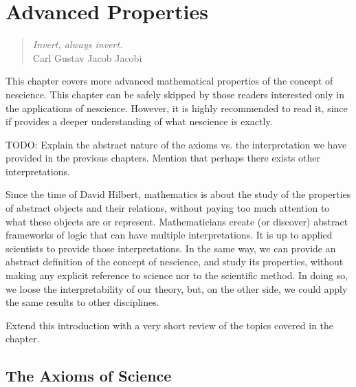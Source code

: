 %
%


\chapter{Advanced Properties}
\label{chap:Properties-Nescience}

\begin{quote}
\begin{flushright}
\emph{Invert, always invert.}\\
Carl Gustav Jacob Jacobi\\
\end{flushright}
\end{quote}
\bigskip

This chapter covers more advanced mathematical properties of the concept of nescience. This chapter can be safely skipped by those readers interested only in the applications of nescience. However, it is highly recommended to read it, since if provides a deeper understanding of what nescience is exactly.

{\color{red} TODO: Explain the abstract nature of the axioms vs. the interpretation we have provided in the previous chapters. Mention that perhaps there exists other interpretations.}

Since the time of David Hilbert, mathematics is about the study of the properties of abstract objects and their relations, without paying too much attention to what these objects are or represent. Mathematicians create (or discover) abstract frameworks of logic that can have multiple interpretations. It is up to applied scientists to provide those interpretations. In the same way, we can provide an abstract definition of the concept of nescience, and study its properties, without making any explicit reference to science nor to the scientific method. In doing so, we loose the interpretability of our theory, but, on the other side, we could apply the same results to other disciplines.

{\color{red} Extend this introduction with a very short review of the topics covered in the chapter.}

%
%

\section{The Axioms of Science}

